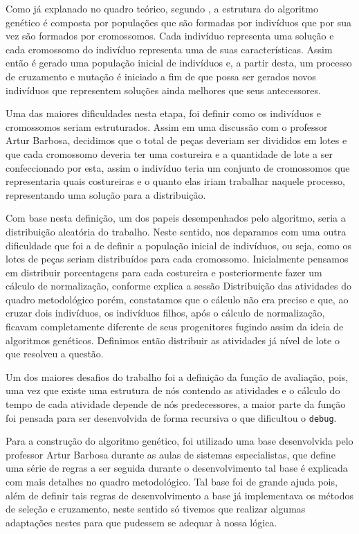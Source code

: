 \par Como já explanado no quadro teórico, segundo , a estrutura do algoritmo genético é composta
por populações que são formadas por indivíduos que por sua vez são formados por cromossomos.
Cada indivíduo representa uma solução e cada cromossomo do indivíduo representa uma de suas características. 
Assim então é gerado uma população inicial de indivíduos e, a partir desta, um processo de cruzamento 
e mutação é iniciado a fim de que possa ser gerados novos indivíduos que representem soluções ainda melhores 
que seus antecessores.

\par Uma das maiores dificuldades nesta etapa, foi definir como os indivíduos e cromossomos seriam estruturados. Assim em uma discussão com o professor Artur Barbosa, decidimos que o total de peças deveriam ser divididos em lotes e que cada cromossomo deveria ter uma costureira 
e a quantidade de lote a ser confeccionado por esta, assim o indivíduo teria um conjunto de cromossomos que representaria quais costureiras 
e o quanto elas iriam trabalhar naquele processo, representando uma solução para a distribuição.

\par Com base nesta definição, um dos papeis desempenhados pelo algoritmo, seria a distribuição aleatória do trabalho. Neste
sentido, nos deparamos com uma outra dificuldade que foi a de definir a população inicial de indivíduos, ou seja, 
como os lotes de peças seriam distribuídos para cada cromossomo. Inicialmente pensamos em distribuir porcentagens para cada costureira
e posteriormente fazer um cálculo de normalização, conforme explica a sessão Distribuição das atividades do quadro metodológico porém,
constatamos que o cálculo não era preciso e que, ao cruzar dois indivíduos, os indivíduos filhos, após o cálculo de normalização, ficavam
completamente diferente de seus progenitores fugindo assim da ideia de algoritmos genéticos. Definimos então distribuir as atividades já 
nível de lote o que resolveu a questão. 

\par Um dos maiores desafios do trabalho foi a definição da função de avaliação, pois, uma vez que existe uma estrutura de nós contendo
as atividades e o cálculo do tempo de cada atividade depende de nós predecessores, a maior parte da função foi pensada para ser 
desenvolvida de forma recursiva o que dificultou o \texttt{debug}. 

\par Para a construção do algoritmo genético, foi utilizado uma base desenvolvida pelo professor Artur Barbosa durante as aulas de sistemas especialistas, que define uma série de regras a ser seguida durante o desenvolvimento tal base é explicada com mais detalhes no quadro metodológico. Tal base foi de grande ajuda pois, além de definir tais regras de desenvolvimento a base já implementava os métodos de 
seleção e cruzamento, neste sentido só tivemos que realizar algumas adaptações nestes para que pudessem se adequar à nossa lógica.

